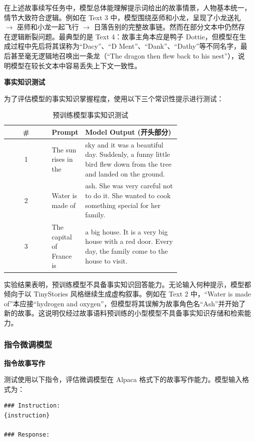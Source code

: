 \documentclass{article}
\begin{document}
在上述故事续写任务中，模型总体能理解提示词给出的故事情景，人物基本统一，情节大致符合逻辑。例如在 Text 3 中，模型围绕巫师和小龙，呈现了小龙送礼 $\to$ 巫师和小龙一起飞行 $\to$ 日落告别的完整故事链。然而在部分文本中仍然存在逻辑断裂问题。最典型的是 Text 4：故事主角本应是鸭子 Dottie，但模型在生成过程中先后将其误称为``Dacy''、``D Ment''、``Dank''、``Dathy''等不同名字，最后甚至毫无逻辑地召唤出一条龙（``The dragon then flew back to his nest''），说明模型在较长文本中容易丢失上下文一致性。

\textbf{事实知识测试}

为了评估模型的事实知识掌握程度，使用以下三个常识性提示进行测试：

\begin{table}[htbp]
  \centering
  \caption{预训练模型事实知识测试}
  \label{tab:factual}
  \footnotesize
  \begin{tabular}{cp{0.15\linewidth}p{0.55\linewidth}}
    \toprule
    \# & Prompt & Model Output (开头部分) \\
    \midrule
    1 & The sun rises in the & sky and it was a beautiful day. Suddenly, a funny little bird flew down from the tree and landed on the ground. \\
    \midrule
    2 & Water is made of & ash. She was very careful not to do it. She wanted to cook something special for her family. \\
    \midrule
    3 & The capital of France is & a big house. It is a very big house with a red door. Every day, the family come to the house to visit. \\
    \bottomrule
  \end{tabular}
\end{table}

实验结果表明，预训练模型不具备事实知识回答能力。无论输入何种提示，模型都倾向于以 TinyStories 风格继续生成虚构叙事。例如在 Text 2 中，``Water is made of''本应接``hydrogen and oxygen''，但模型将其误解为故事角色名``Ash''并开始了新的故事。这说明仅经过故事语料预训练的小型模型不具备事实知识存储和检索能力。

\subsubsection{指令微调模型}

\textbf{指令故事写作}

测试使用以下指令，评估微调模型在 Alpaca 格式下的故事写作能力。模型输入格式为：

\begin{verbatim}
### Instruction:
{instruction}

### Response:
\end{verbatim}
\end{document}
